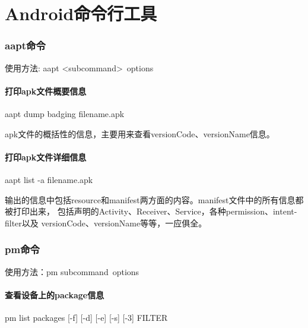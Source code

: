 ﻿\documentclass[a4paper,11pt]{article}
\begin{document}
  \tt %

  \pagestyle{header}
  \sybmaketitle
  \tableofcontents
  \newpage

  \pagestyle{main}
  \setcounter{page}{1}
  
  \part[Commands for Android]{Android命令行工具}
  \section[aapt - Android Asset Packaging Tool]{aapt命令}
  使用方法: aapt \textless subcommand\textgreater\ \lt options\gt
  \subsection[print apk file badging information]{打印apk文件概要信息}
  aapt dump badging filename.apk

  apk文件的概括性的信息，主要用来查看versionCode、versionName信息。

  \subsection[print apk file verbose information]{打印apk文件详细信息}
  aapt list -a filename.apk

  输出的信息中包括resource和manifest两方面的内容。manifest文件中的所有信息都被打印出来，
  包括声明的Activity、Receiver、Service，各种permission、intent-filter以及
  versionCode、versionName等等，一应俱全。

  \section[pm - Package Manager]{pm命令}
  使用方法：pm \lt subcommand\gt\ \lt options\gt

  \subsection[list packages]{查看设备上的package信息}
  pm list packages [-f] [-d] [-e] [-s] [-3] FILTER
\end{document}
